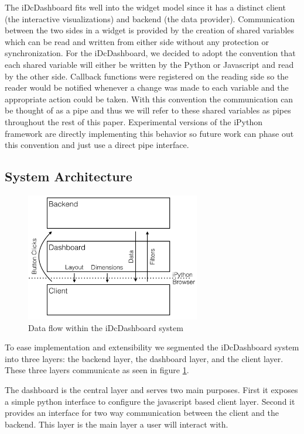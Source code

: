 \documentclass[letter,twocolumn]{article}
\begin{document}
The iDcDashboard fits well into the widget model since it has a distinct client (the interactive visualizations) and backend (the data provider).
Communication between the two sides in a widget is provided by the creation of shared variables which can be read and written from either side without any protection or synchronization.
For the iDcDashboard, we decided to adopt the convention that each shared variable will either be written by the Python or Javascript and read by the other side.
Callback functions were registered on the reading side so the reader would be notified whenever a change was made to each variable and the appropriate action could be taken.
With this convention the communication can be thought of as a pipe and thus we will refer to these shared variables as pipes throughout the rest of this paper.
Experimental versions of the iPython framework are directly implementing this behavior so future work can phase out this convention and just use a direct pipe interface.

\subsection{System Architecture}
\begin{figure}[htb]
	\begin{center}
	\includegraphics[width=3in]{figs/dataflow.png}
	\end{center}
	\caption{Data flow within the iDcDashboard system}\label{fig:system_flow}
\end{figure}

To ease implementation and extensibility we segmented the iDcDashboard system into three layers: the backend layer, the dashboard layer, and the client layer.
These three layers communicate as seen in figure \ref{fig:system_flow}.

The dashboard is the central layer and serves two main purposes.
First it exposes a simple python interface to configure the javascript based client layer.
Second it provides an interface for two way communication between the client and the backend.
This layer is the main layer a user will interact with.
\end{document}
